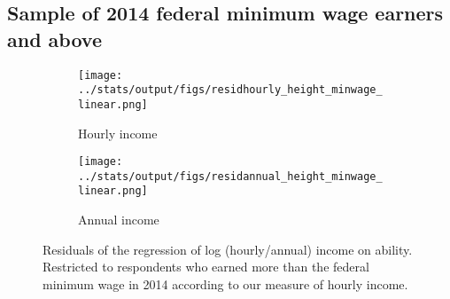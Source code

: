 \clearpage
\subsection{Sample of 2014 federal minimum wage earners and above}
\begin{figure}[htbp]
	\begin{subfigure}[b]{0.9\textwidth}
		\centering
		\texttt{[image: ../stats/output/figs/residhourly\_height\_minwage\_linear.png]}	
		\label{fig:hourlyresidheight_minwage_linear}
		\caption{Hourly income}
	\end{subfigure}
	
	\begin{subfigure}[b]{0.9\textwidth}
		\centering
		\texttt{[image: ../stats/output/figs/residannual\_height\_minwage\_linear.png]}	
		\label{fig:annualresidheight_minwage_linear}
		\caption{Annual income}
	\end{subfigure}
	\caption{Residuals of the regression of log (hourly/annual) income on ability. Restricted to respondents who earned more than the federal minimum wage in 2014 according to our measure of hourly income.}
\end{figure}